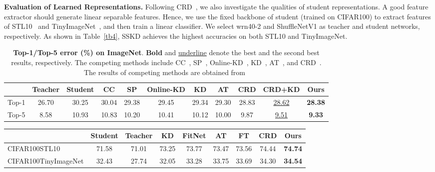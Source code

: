 \documentclass[runningheads]{llncs}
\begin{document}
\noindent
\textbf{Evaluation of Learned Representations.}
Following CRD~\cite{crd}, we also investigate the qualities of student representations. A good feature extractor should generate linear separable features. Hence, we use the fixed backbone of student (trained on CIFAR100) to extract features of STL10~\cite{stl10} and TinyImageNet~\cite{tinyimagenet}, and then train a linear classifier.
We select wrn40-2 and ShuffleNetV1 as teacher and student networks, respectively.
As shown in Table~\ref{tb4}, SSKD achieves the highest accuracies on both STL10 and TinyImageNet.

\begin{table}[t]
    \small
	\centering
	\caption{\textbf{Top-1/Top-5 error (\%) on ImageNet}. \textbf{Bold} and \underline{underline} denote the best and the second best results, respectively. The competing methods include CC~\cite{cc}, SP~\cite{simi}, Online-KD~\cite{onlinekd}, KD~\cite{KD}, AT~\cite{AT}, and CRD~\cite{crd}. The results of competing methods are obtained from~\cite{crd}}
	\vspace{-5pt}
	\begin{tabular}{c|cc|ccccccc|c}
	\toprule
	& Teacher & Student & CC & SP & Online-KD & KD & AT & CRD & CRD+KD & Ours \\
	\midrule
	Top-1 & 26.70 & 30.25 & 30.04 & 29.38 & 29.45 & 29.34 & 29.30 & 28.83 & \underline{28.62} & \textbf{28.38} \\ 
	Top-5 & 8.58 & 10.93 & 10.83 & 10.20 & 10.41 & 10.12 & 10.00 & 9.87 & \underline{9.51} & \textbf{9.33}  \\
	\bottomrule
	\end{tabular}
	\label{tb3}
\end{table}

\begin{table*}[t]
    \small
	\centering
	\caption{\textbf{Linear Classification Accuracy (\%) on STL10 and TinyImageNet}. We use wrn40-2 and ShuffleNetV1 as teacher and student networks, respectively. The competing methods include KD~\cite{KD}, FitNet~\cite{fitnets}, AT~\cite{AT}, FT~\cite{FT}, and CRD~\cite{crd}}
	\vspace{-5pt}
	\begin{tabular}{cc|cc|ccccc|c}
		\hline
		\multicolumn{2}{c|}{} & Student & Teacher & KD & FitNet & AT & FT & CRD & Ours\\
		\hline
		\multicolumn{2}{l|}{CIFAR100STL10} & 71.58 & 71.01 & 73.25 & 73.77 & 73.47 & 73.56 & 74.44 & \textbf{74.74}\\
		\multicolumn{2}{l|}{CIFAR100TinyImageNet} & 32.43 & 27.74 & 32.05 & 33.28 & 33.75 & 33.69 & 34.30 & \textbf{34.54}\\
		\hline 
	\end{tabular}
	\label{tb4}
\end{table*}
\end{document}
